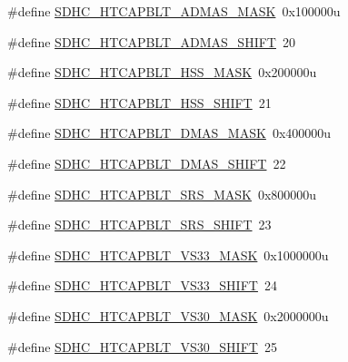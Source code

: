 \begin{DoxyCompactItemize}
\item 
\#define \hyperlink{group___s_d_h_c___register___masks_gadb87583a1db8c53c61fdac8604e1ecc5}{S\+D\+H\+C\+\_\+\+H\+T\+C\+A\+P\+B\+L\+T\+\_\+\+A\+D\+M\+A\+S\+\_\+\+M\+A\+SK}~0x100000u
\item 
\#define \hyperlink{group___s_d_h_c___register___masks_ga6ceeb752d9ccad530b178fef829a9db6}{S\+D\+H\+C\+\_\+\+H\+T\+C\+A\+P\+B\+L\+T\+\_\+\+A\+D\+M\+A\+S\+\_\+\+S\+H\+I\+FT}~20
\item 
\#define \hyperlink{group___s_d_h_c___register___masks_gabe87f7e9a2aa3b99012eaae8321aed89}{S\+D\+H\+C\+\_\+\+H\+T\+C\+A\+P\+B\+L\+T\+\_\+\+H\+S\+S\+\_\+\+M\+A\+SK}~0x200000u
\item 
\#define \hyperlink{group___s_d_h_c___register___masks_gae24b3d89ddf5bf4bf48ccc6fa948891d}{S\+D\+H\+C\+\_\+\+H\+T\+C\+A\+P\+B\+L\+T\+\_\+\+H\+S\+S\+\_\+\+S\+H\+I\+FT}~21
\item 
\#define \hyperlink{group___s_d_h_c___register___masks_ga5252cbd3675e74a01efa99cf6b754c8a}{S\+D\+H\+C\+\_\+\+H\+T\+C\+A\+P\+B\+L\+T\+\_\+\+D\+M\+A\+S\+\_\+\+M\+A\+SK}~0x400000u
\item 
\#define \hyperlink{group___s_d_h_c___register___masks_gab0236dd93e36239ae39f6b813eeb11a1}{S\+D\+H\+C\+\_\+\+H\+T\+C\+A\+P\+B\+L\+T\+\_\+\+D\+M\+A\+S\+\_\+\+S\+H\+I\+FT}~22
\item 
\#define \hyperlink{group___s_d_h_c___register___masks_ga62e346d8925d26124eb284b4ebf984d3}{S\+D\+H\+C\+\_\+\+H\+T\+C\+A\+P\+B\+L\+T\+\_\+\+S\+R\+S\+\_\+\+M\+A\+SK}~0x800000u
\item 
\#define \hyperlink{group___s_d_h_c___register___masks_ga47c009f4b74a67296231bb73fa1c74f8}{S\+D\+H\+C\+\_\+\+H\+T\+C\+A\+P\+B\+L\+T\+\_\+\+S\+R\+S\+\_\+\+S\+H\+I\+FT}~23
\item 
\#define \hyperlink{group___s_d_h_c___register___masks_gaefb26b10e16d07a763c3a6aa87d64c77}{S\+D\+H\+C\+\_\+\+H\+T\+C\+A\+P\+B\+L\+T\+\_\+\+V\+S33\+\_\+\+M\+A\+SK}~0x1000000u
\item 
\#define \hyperlink{group___s_d_h_c___register___masks_ga134420d6cffd9c730caecd7cc64f1d41}{S\+D\+H\+C\+\_\+\+H\+T\+C\+A\+P\+B\+L\+T\+\_\+\+V\+S33\+\_\+\+S\+H\+I\+FT}~24
\item 
\#define \hyperlink{group___s_d_h_c___register___masks_ga0ca13e82557e6d15a923fe3a389d36fb}{S\+D\+H\+C\+\_\+\+H\+T\+C\+A\+P\+B\+L\+T\+\_\+\+V\+S30\+\_\+\+M\+A\+SK}~0x2000000u
\item 
\#define \hyperlink{group___s_d_h_c___register___masks_ga519f2554cbaafb3391d0d123f2536f80}{S\+D\+H\+C\+\_\+\+H\+T\+C\+A\+P\+B\+L\+T\+\_\+\+V\+S30\+\_\+\+S\+H\+I\+FT}~25

\end{DoxyCompactItemize}
